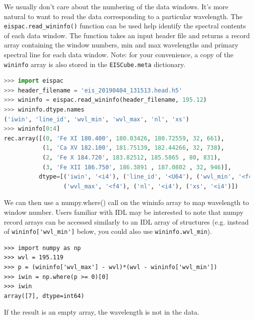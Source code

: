 We usually don't care about the numbering of the data windows. It's more natural to want to read
the data corresponding to a particular wavelength. The \verb+eispac.read_wininfo()+ function can be used help identify the spectral contents of each data window. The function takes an input header file and returns a record array containing the window numbers, min and max wavelengths and primary spectral line for each data window. Note: for your convenience, a copy of the \verb+wininfo+ array is also stored in the \verb+EISCube.meta+ dictionary.
\begin{lstlisting}[language=Python]
>>> import eispac
>>> header_filename = 'eis_20190404_131513.head.h5'
>>> wininfo = eispac.read_wininfo(header_filename, 195.12)
>>> wininfo.dtype.names
('iwin', 'line_id', 'wvl_min', 'wvl_max', 'nl', 'xs')
>>> wininfo[0:4]
rec.array([(0, 'Fe XI 180.400', 180.03426, 180.72559, 32, 661),
           (1, 'Ca XV 182.100', 181.75139, 182.44266, 32, 738),
           (2, 'Fe X 184.720', 183.82512, 185.5865 , 80, 831),
           (3, 'Fe XII 186.750', 186.3891 , 187.0802 , 32, 946)],
          dtype=[('iwin', '<i4'), ('line_id', '<U64'), ('wvl_min', '<f4'),
                 ('wvl_max', '<f4'), ('nl', '<i4'), ('xs', '<i4')])
\end{lstlisting}
We can then use a numpy.where() call on the wininfo array to map wavelength to window number.
Users familiar with IDL may be interested to note that numpy record arrays can be accessed similarly to an IDL array of structures (e.g. instead of \verb+wininfo['wvl_min']+ below, you could also use \verb+wininfo.wvl_min+).
\begin{lstlisting}
>>> import numpy as np
>>> wvl = 195.119
>>> p = (wininfo['wvl_max'] - wvl)*(wvl - wininfo['wvl_min'])
>>> iwin = np.where(p >= 0)[0]
>>> iwin
array([7], dtype=int64)
\end{lstlisting}
If the result is an empty array, the wavelength is not in the data.
